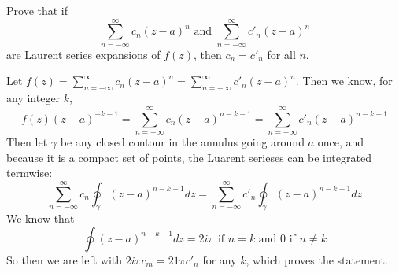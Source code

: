\documentclass[12pt]{article}
\begin{document}
\begin{statement}
  Prove that if 
  $$ \sum^{\infty}_{n=-\infty} c_n(z-a)^n \text{ and } \sum^{\infty}_{n=-\infty} c'_n(z-a)^n $$
  are Laurent series expansions of $f(z)$, then $c_n=c'_n$ for all $n$.
\end{statement}
\begin{newproof}
  Let $f(z)=\sum^{\infty}_{n=-\infty} c_n(z-a)^n=\sum^{\infty}_{n=-\infty} c'_n(z-a)^n$. Then we know, for any integer $k$,  
  \begin{equation*}
    f(z)(z-a)^{-k-1}=\sum^{\infty}_{n=-\infty} c_n(z-a)^{n-k-1}=\sum^{\infty}_{n=-\infty} c'_n(z-a)^{n-k-1}
  \end{equation*}
  Then let $\gamma$ be any closed contour in the annulus going around $a$ once, and because it is a compact set 
  of points, the Luarent serieses can be integrated termwise:
  \begin{equation*}
    \sum^{\infty}_{n=-\infty}c_n \oint_{\gamma} (z-a)^{n-k-1}dz=\sum^{\infty}_{n=-\infty}c'_n \oint_{\gamma} (z-a)^{n-k-1}dz
  \end{equation*}
  We know that 
  \begin{equation*}
    \oint(z-a)^{n-k-1}dz = 2i\pi \text{ if } n=k \text{ and } 0 \text{ if } n \neq k
  \end{equation*}
  So then we are left with $2i\pi c_m = 21\pi c'_n$ for any $k$, which proves the statement.
\end{newproof}
\end{document}
